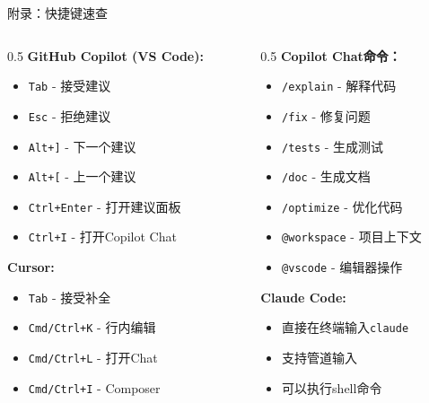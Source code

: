 \documentclass[aspectratio=169,11pt]{beamer}
\begin{document}
\begin{frame}{附录：快捷键速查}
    \begin{columns}
        \begin{column}{0.5\textwidth}
            \textbf{GitHub Copilot (VS Code):}
            \begin{itemize}
                \item \texttt{Tab} - 接受建议
                \item \texttt{Esc} - 拒绝建议
                \item \texttt{Alt+]} - 下一个建议
                \item \texttt{Alt+[} - 上一个建议
                \item \texttt{Ctrl+Enter} - 打开建议面板
                \item \texttt{Ctrl+I} - 打开Copilot Chat
            \end{itemize}
            
            \vspace{0.3cm}
            \textbf{Cursor:}
            \begin{itemize}
                \item \texttt{Tab} - 接受补全
                \item \texttt{Cmd/Ctrl+K} - 行内编辑
                \item \texttt{Cmd/Ctrl+L} - 打开Chat
                \item \texttt{Cmd/Ctrl+I} - Composer
            \end{itemize}
        \end{column}
        \begin{column}{0.5\textwidth}
            \textbf{Copilot Chat命令：}
            \begin{itemize}
                \item \texttt{/explain} - 解释代码
                \item \texttt{/fix} - 修复问题
                \item \texttt{/tests} - 生成测试
                \item \texttt{/doc} - 生成文档
                \item \texttt{/optimize} - 优化代码
                \item \texttt{@workspace} - 项目上下文
                \item \texttt{@vscode} - 编辑器操作
            \end{itemize}
            
            \vspace{0.3cm}
            \textbf{Claude Code:}
            \begin{itemize}
                \item 直接在终端输入\texttt{claude}
                \item 支持管道输入
                \item 可以执行shell命令
            \end{itemize}
        \end{column}
    \end{columns}
\end{frame}
\end{document}
